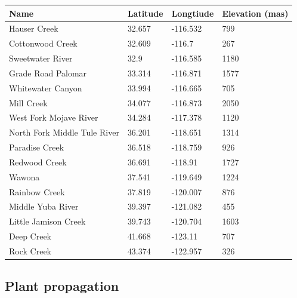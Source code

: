 \documentclass[11pt, oneside]{article}
\begin{document}

\begin{table}[ht]
   \centering
   \begin{tabular}{@{} llll @{}}
      \toprule
  Name  & Latitude  & Longtiude  & Elevation (mas) \\
      \midrule
	Hauser Creek & 32.657	& 
    -116.532	& 799   \\
	Cottonwood Creek	& 32.609 & 
    -116.7	& 267   \\
	Sweetwater River	& 32.9 & 
    -116.585	& 1180   \\
	Grade Road Palomar & 33.314 &
    -116.871	& 1577   \\
	Whitewater Canyon & 33.994 & 
    -116.665	& 705   \\
	Mill Creek	& 34.077 & 
    -116.873	& 2050   \\
	West Fork Mojave River	& 34.284 & 
    -117.378	& 1120   \\
	North Fork Middle Tule River	& 36.201 & 
    -118.651	& 1314   \\
	Paradise Creek	& 36.518 & 
    -118.759	& 926   \\
	Redwood Creek	& 36.691 & 
    -118.91	& 1727   \\
	Wawona  & 37.541 & 
    -119.649	& 1224   \\
	Rainbow Creek	& 37.819 & 
    -120.007	& 876   \\
	Middle Yuba River	& 39.397 & 
    -121.082	& 455   \\
	Little Jamison Creek	& 39.743 & 
    -120.704	& 1603   \\
	Deep Creek	& 41.668 & 
    -123.11	& 707   \\
	Rock Creek	& 43.374 & 
    -122.957	& 326   \\
	\bottomrule
	\end{tabular}
	\label{table:Table_FocalPops}
\end{table}

\subsection*{Plant propagation}
\end{document}
